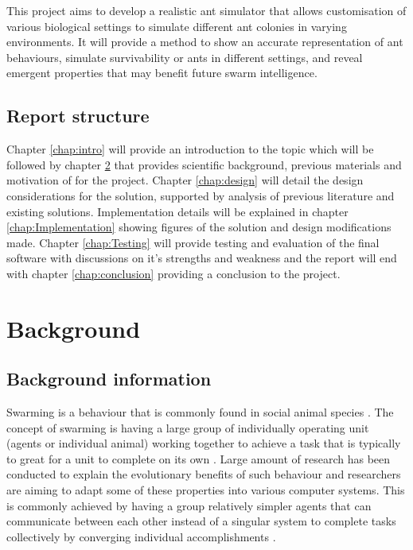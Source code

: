 \documentclass[a4paper, oneside, 11pt]{report}
\begin{document}
This project aims to develop a realistic ant simulator that allows customisation of various biological settings to simulate different ant colonies in varying environments. It will provide a method to show an accurate representation of ant behaviours, simulate survivability or ants in different settings, and reveal emergent properties that may benefit future swarm intelligence.

\section{Report structure}
Chapter \ref{chap:intro} will provide an introduction to the topic which will be followed by chapter \ref{chap:background} that provides scientific background, previous materials and motivation of for the project. Chapter \ref{chap:design} will detail the design considerations for the solution, supported by analysis of previous literature and existing solutions. Implementation details will be explained in chapter \ref{chap:Implementation} showing figures of the solution and design modifications made. Chapter \ref{chap:Testing} will provide testing and evaluation of the final software with discussions on it's strengths and weakness and the report will end with chapter \ref{chap:conclusion} providing a conclusion to the project.

\chapter{Background}
\label{chap:background}
\section{Background information}
Swarming is a behaviour that is commonly found in social animal species \citep{Swarm_Animals}. The concept of swarming is having a large group of individually operating unit (agents or individual animal) working together to achieve a task that is typically to great for a unit to complete on its own \citep{Swarm_Explanation}. Large amount of research has been conducted to explain the evolutionary benefits of such behaviour and researchers are aiming to adapt some of these properties into various computer systems. This is commonly achieved by having a group relatively simpler agents that can communicate between each other instead of a singular system to complete tasks collectively by converging individual accomplishments \citep{Swarm_Properties}.
\end{document}
